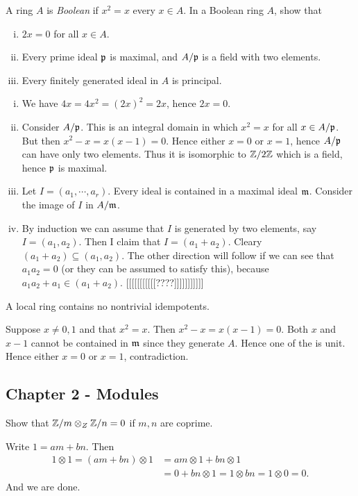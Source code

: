 \documentclass[11pt, english]{article}
\begin{document}
\begin{exc}[Exercise 11]
A ring $A$ is \emph{Boolean} if $x^2=x$ every $x \in A$. In a Boolean ring $A$, show that
\begin{enumerate}[i)]
\item $2x=0$ for all $x \in A$.
\item Every prime ideal $\mathfrak{p}$ is maximal, and $A/\mathfrak{p}$ is a field with two elements.
\item Every finitely generated ideal in $A$ is principal.
\end{enumerate}
\end{exc}
\begin{sol}
  \begin{enumerate}[i)]
  \item We have $4x=4x^2=(2x)^2=2x$, hence $2x=0$.
\item Consider $A/\mathfrak{p}$. This is an integral domain in which $x^2=x$ for all $x \in A/\mathfrak{p}$. But then $x^2-x=x(x-1)=0$. Hence either $x=0$ or $x=1$, hence $A/\mathfrak{p}$ can have only two elements. Thus it is isomorphic to $\mathbb{Z}/2\mathbb{Z}$ which is a field, hence $\mathfrak{p}$ is maximal.
\item Let $I=(a_1,\cdots,a_r)$. Every ideal is contained in a maximal ideal $\mathfrak{m}$. Consider the image of $I$ in $A/\mathfrak{m}$. 
\item By induction we can assume that $I$ is generated by two elements, say $I=(a_1,a_2)$. Then I claim that $I=(a_1+a_2)$. Cleary $(a_1+a_2) \subseteq (a_1,a_2)$. The other direction will follow if we can see that $a_1a_2=0$ (or they can be assumed to satisfy this), because $a_1a_2+a_1 \in (a_1+a_2)$.  [[[[[[[[[[[????]]]]]]]]]]]
\end{enumerate}
\end{sol}

\begin{exc}[Exercise 12]
A local ring contains no nontrivial idempotents.  
\end{exc}
\begin{sol}
Suppose $x \neq 0,1$ and that $x^2=x$. Then $x^2-x=x(x-1)=0$. Both $x$ and $x-1$ cannot be contained in $\mathfrak{m}$ since they generate $A$. Hence one of the is unit. Hence either $x=0$ or $x=1$, contradiction. 
\end{sol}

\subsection{Chapter 2 - Modules}

\begin{exc}[Excercise 1]
Show that $\mathbb{Z}/m \otimes_Z \mathbb{Z}/n = 0$ if $m,n$ are coprime.
\end{exc}
\begin{sol}
Write $1=am+bn$. Then 
\begin{align*}
1 \otimes 1 = (am+bn) \otimes 1 &= am \otimes 1 + bn \otimes 1 \\
&=  0 + bn \otimes 1 = 1 \otimes bn = 1 \otimes 0 = 0.
\end{align*}
And we are done.
\end{sol}
\end{document}
